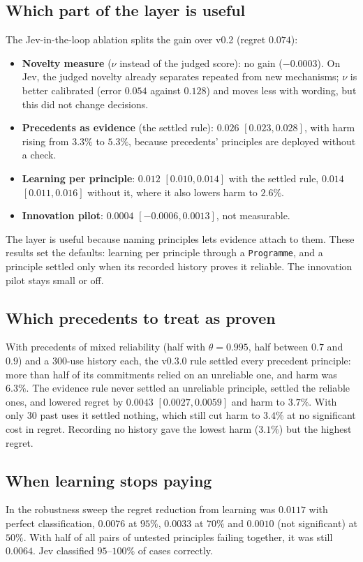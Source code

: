 \documentclass[11pt]{article}
\begin{document}
\subsection*{Which part of the layer is useful}
The Jev-in-the-loop ablation splits the gain over v0.2 (regret $0.074$):
\begin{itemize}
\item \textbf{Novelty measure} ($\nu$ instead of the judged score): no gain ($-0.0003$). On Jev, the
judged novelty already separates repeated from new mechanisms; $\nu$ is better calibrated (error
$0.054$ against $0.128$) and moves less with wording, but this did not change decisions.
\item \textbf{Precedents as evidence} (the settled rule): $0.026$ $[0.023,0.028]$, with harm rising
from $3.3\%$ to $5.3\%$, because precedents' principles are deployed without a check.
\item \textbf{Learning per principle}: $0.012$ $[0.010,0.014]$ with the settled rule, $0.014$
$[0.011,0.016]$ without it, where it also lowers harm to $2.6\%$.
\item \textbf{Innovation pilot}: $0.0004$ $[-0.0006,0.0013]$, not measurable.
\end{itemize}
The layer is useful because naming principles lets evidence attach to them. These results set
the defaults: learning per principle through a \texttt{Programme}, and a principle settled only when
its recorded history proves it reliable. The innovation pilot stays small or off.

\subsection*{Which precedents to treat as proven}
With precedents of mixed reliability (half with $\theta=0.995$, half between $0.7$ and $0.9$) and a
300-use history each, the v0.3.0 rule settled every precedent principle: more than half of its
commitments relied on an unreliable one, and harm was $6.3\%$. The evidence rule never settled an
unreliable principle, settled the reliable ones, and lowered regret by $0.0043$ $[0.0027,0.0059]$ and
harm to $3.7\%$. With only 30 past uses it settled nothing, which still cut harm to $3.4\%$ at no
significant cost in regret. Recording no history gave the lowest harm ($3.1\%$) but the highest
regret.

\subsection*{When learning stops paying}
In the robustness sweep the regret reduction from learning was $0.0117$ with perfect classification,
$0.0076$ at $95\%$, $0.0033$ at $70\%$ and $0.0010$ (not significant) at $50\%$. With half of all
pairs of untested principles failing together, it was still $0.0064$. Jev classified $95$--$100\%$ of
cases correctly.
\end{document}
